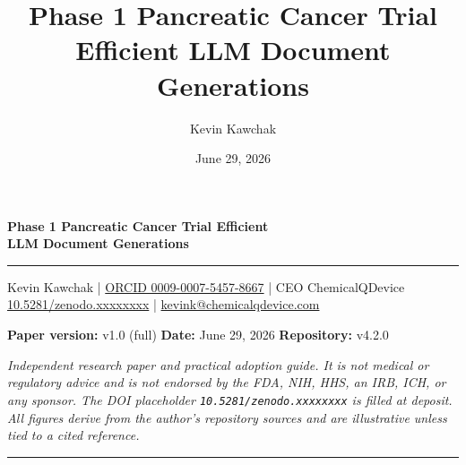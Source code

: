 \documentclass[11pt]{article}
\title{Phase 1 Pancreatic Cancer Trial Efficient LLM Document Generations}
\author{Kevin Kawchak}
\date{June 29, 2026}
\begin{document}
\thispagestyle{plain}

\begin{center}
{\LARGE\bfseries Phase 1 Pancreatic Cancer Trial Efficient\\LLM Document Generations}\\[0.5em]
{\color{paperblack}\rule{\linewidth}{1.2pt}}
\end{center}

\begin{center}\small
Kevin Kawchak \;|\; \href{https://orcid.org/0009-0007-5457-8667}{ORCID 0009-0007-5457-8667} \;|\;
CEO ChemicalQDevice \\
\href{https://doi.org/10.5281/zenodo.xxxxxxxx}{10.5281/zenodo.xxxxxxxx} \;|\;
\href{mailto:kevink@chemicalqdevice.com}{kevink@chemicalqdevice.com}
\end{center}

\begin{center}\footnotesize
\textbf{Paper version:} v1.0 (full) \quad
\textbf{Date:} June 29, 2026 \quad
\textbf{Repository:} v4.2.0
\end{center}

\noindent\footnotesize\textit{Independent research paper and practical adoption
guide. It is not medical or regulatory advice and is not endorsed by the FDA, NIH,
HHS, an IRB, ICH, or any sponsor. The DOI placeholder
\texttt{10.5281/zenodo.xxxxxxxx} is filled at deposit. All figures derive from the
author's repository sources and are illustrative unless tied to a cited
reference.}\normalsize\par

\vspace{0.4em}
{\color{paperblack}\rule{\linewidth}{0.6pt}}





\renewcommand{\contentsname}{Table of Contents}
{\setlength{\parskip}{0pt}\small\tableofcontents}







\end{document}
